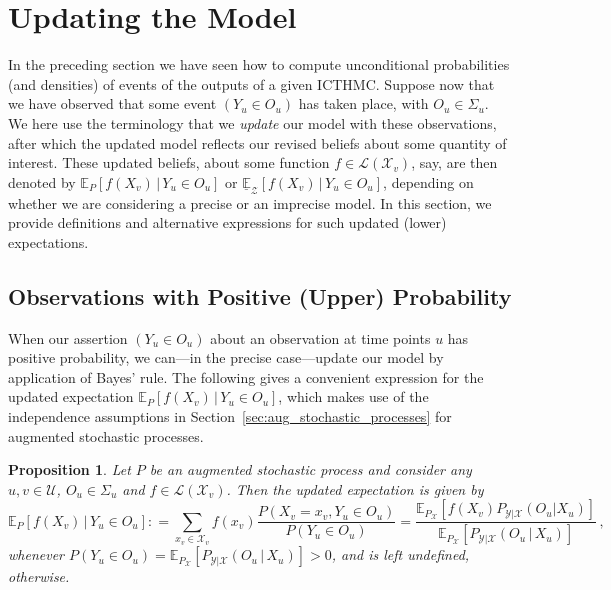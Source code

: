 \documentclass[3p]{elsarticle}
\newtheorem{proposition}[theorem]{Proposition}
\newcommand{\states}{\mathcal{X}}
\newcommand{\observs}{\mathcal{Y}}
\newcommand{\gambles}{\mathcal{L}}
\newcommand{\coloneqq}{:\!=}
\begin{document}
\section{Updating the Model}\label{sec:updating_model}


In the preceding section we have seen how to compute unconditional probabilities (and densities) of events of the outputs of a given ICTHMC. Suppose now that we have observed that some event $(Y_u\in O_u)$ has taken place, with $O_u\in\Sigma_u$. We here use the terminology that we \emph{update} our model with these observations, after which the updated model reflects our revised beliefs about some quantity of interest. These updated beliefs, about some function $f\in\gambles(\states_v)$, say, are then denoted by
$\mathbb{E}_P[f(X_v)\,\vert\,Y_u\in O_u]$
or $\underline{\mathbb{E}}_\mathcal{Z}[f(X_v)\,\vert\,Y_u\in O_u]$, 
depending on whether we are considering a precise or an imprecise model. In this section, we provide definitions and alternative expressions for such updated (lower) expectations.
\vspace{-8pt}

\subsection{Observations with Positive (Upper) Probability}\label{subsec:pos_prob}

When our assertion $(Y_u\in O_u)$ about an observation at time points $u$ has positive probability, we can---in the precise case---update our model by application of Bayes' rule. The following gives a convenient expression for the updated expectation $\mathbb{E}_P[f(X_v)\,\vert\,Y_u\in O_u]$, which makes use of the independence assumptions in Section~\ref{sec:aug_stochastic_processes} for augmented stochastic processes.
\begin{proposition}\label{prop:precise_conditioning_for_positive}
Let $P$ be an augmented stochastic process and consider any $u,v\in\mathcal{U}$, $O_u\in\Sigma_u$ and $f\in\gambles(\states_v)$. Then the updated expectation is given by
\begin{equation*}
\mathbb{E}_P[f(X_v)\,\vert\,Y_u\in O_u] \coloneqq \sum_{x_v\in\states_v}f(x_v)\frac{P(X_v=x_v, Y_u\in O_u)}{P(Y_u\in O_u)} = \frac{\mathbb{E}_{P_\states}[f(X_v)P_{\observs\vert\states}(O_u\vert X_u)]}{\mathbb{E}_{P_\states}[P_{\observs\vert\states}(O_u\,\vert\,X_u)]}\,,
\end{equation*}
whenever $P(Y_u\in O_u)=\mathbb{E}_{P_\states}[P_{\observs\vert\states}(O_u\,\vert\,X_u)]>0$, and is left undefined, otherwise.
\end{proposition}
\end{document}
